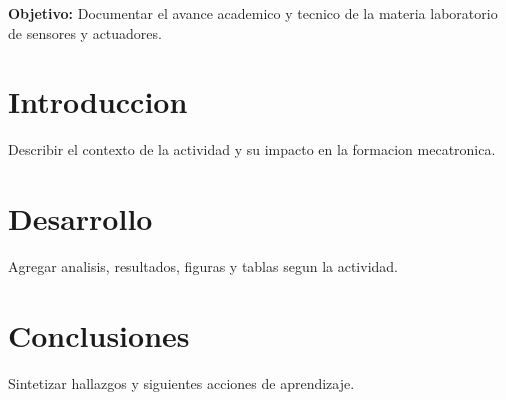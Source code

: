 \documentclass[spanish,letterpaper,oneside]{article}
\begin{document}
\templatePortrait
\templatePagecfg
\onehalfspacing

\begin{abstractd}
\textbf{Objetivo:} Documentar el avance academico y tecnico de la materia laboratorio de sensores y actuadores.
\end{abstractd}

\templateIndex
\templateFinalcfg

\section{Introduccion}
Describir el contexto de la actividad y su impacto en la formacion mecatronica.

\section{Desarrollo}
Agregar analisis, resultados, figuras y tablas segun la actividad.

\section{Conclusiones}
Sintetizar hallazgos y siguientes acciones de aprendizaje.



\end{document}
